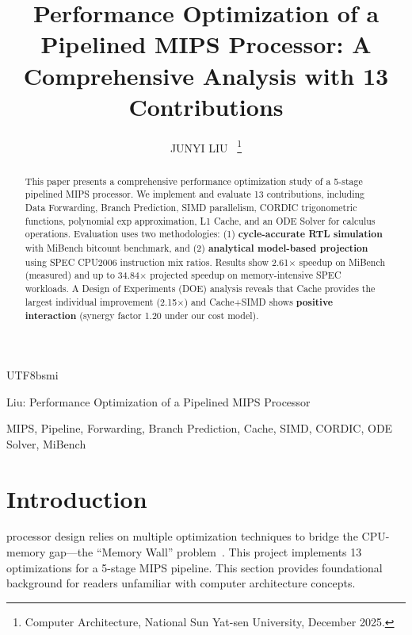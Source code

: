 \documentclass[journal,twoside]{IEEEtran}
\begin{document}
\begin{CJK}{UTF8}{bsmi}  %

\title{Performance Optimization of a Pipelined MIPS Processor: A Comprehensive Analysis with 13 Contributions}

\author{JUNYI LIU~
\thanks{Computer Architecture, National Sun Yat-sen University, December 2025.}}

%
{Liu: Performance Optimization of a Pipelined MIPS Processor}

\maketitle

\begin{abstract}
This paper presents a comprehensive performance optimization study of a 5-stage pipelined MIPS processor. We implement and evaluate 13 contributions, including Data Forwarding, Branch Prediction, SIMD parallelism, CORDIC trigonometric functions, polynomial exp approximation, L1 Cache, and an ODE Solver for calculus operations. Evaluation uses two methodologies: (1) \textbf{cycle-accurate RTL simulation} with MiBench bitcount benchmark, and (2) \textbf{analytical model-based projection} using SPEC CPU2006 instruction mix ratios. Results show 2.61$\times$ speedup on MiBench (measured) and up to 34.84$\times$ projected speedup on memory-intensive SPEC workloads. A Design of Experiments (DOE) analysis reveals that Cache provides the largest individual improvement (2.15$\times$) and Cache+SIMD shows \textbf{positive interaction} (synergy factor 1.20 under our cost model).
\end{abstract}

\begin{IEEEkeywords}
MIPS, Pipeline, Forwarding, Branch Prediction, Cache, SIMD, CORDIC, ODE Solver, MiBench
\end{IEEEkeywords}

\section{Introduction}
 processor design relies on multiple optimization techniques to bridge the CPU-memory gap---the ``Memory Wall'' problem~\cite{hennessy2017computer}. This project implements 13 optimizations for a 5-stage MIPS pipeline. This section provides foundational background for readers unfamiliar with computer architecture concepts.


\end{CJK}
\end{document}
